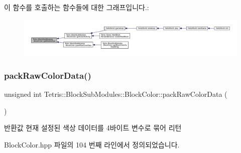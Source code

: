이 함수를 호출하는 함수들에 대한 그래프입니다.\+:
\nopagebreak
\begin{figure}[H]
\begin{center}
\leavevmode
\includegraphics[width=350pt]{class_tetris_1_1_block_sub_modules_1_1_block_color_a1795cf70c847d261645a9690afff7e9c_icgraph}
\end{center}
\end{figure}
\mbox{\label{class_tetris_1_1_block_sub_modules_1_1_block_color_a849ebbb0e900c5efdcb99784767e7a7a}} 
\subsubsection{\texorpdfstring{pack\+Raw\+Color\+Data()}{packRawColorData()}}
{\footnotesize\ttfamily unsigned int Tetris\+::\+Block\+Sub\+Modules\+::\+Block\+Color\+::pack\+Raw\+Color\+Data (\begin{DoxyParamCaption}{ }\end{DoxyParamCaption})\hspace{0.3cm}{\ttfamily [inline]}}

\begin{DoxyReturn}{반환값}
현재 설정된 색상 데이터를 4바이트 변수로 묶어 리턴 
\end{DoxyReturn}


Block\+Color.\+hpp 파일의 104 번째 라인에서 정의되었습니다.

